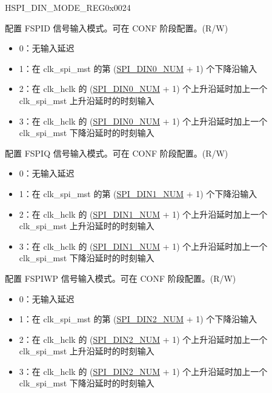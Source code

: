 \begin{register}{H}{SPI\_DIN\_MODE\_REG}{0x0024}\label{regdesc:SPIDINMODEREG}
%
%
%
%
%
%
%
\regnewline%
\begin{regdesc}\begin{reglist}
\label{fielddesc:SPIDIN0MODE}\item [SPI\_DIN0\_MODE] 配置 FSPID 信号输入模式。可在 CONF 阶段配置。(R/W)
\begin{itemize}
    \item 0：无输入延迟
    \item 1：在 clk\_spi\_mst 的第 (\hyperref[fielddesc:SPIDIN0NUM]{SPI\_DIN0\_NUM} + 1) 个下降沿输入
    \item 2：在 clk\_hclk 的 (\hyperref[fielddesc:SPIDIN0NUM]{SPI\_DIN0\_NUM} + 1) 个上升沿延时加上一个 clk\_spi\_mst 上升沿延时的时刻输入
    \item 3：在 clk\_hclk 的 (\hyperref[fielddesc:SPIDIN0NUM]{SPI\_DIN0\_NUM} + 1) 个上升沿延时加上一个 clk\_spi\_mst 下降沿延时的时刻输入
\end{itemize}

\label{fielddesc:SPIDIN1MODE}\item [SPI\_DIN1\_MODE] 配置 FSPIQ 信号输入模式。可在 CONF 阶段配置。(R/W)
\begin{itemize}
    \item 0：无输入延迟
    \item 1：在 clk\_spi\_mst 的第 (\hyperref[fielddesc:SPIDIN1NUM]{SPI\_DIN1\_NUM} + 1) 个下降沿输入
    \item 2：在 clk\_hclk 的 (\hyperref[fielddesc:SPIDIN1NUM]{SPI\_DIN1\_NUM} + 1) 个上升沿延时加上一个 clk\_spi\_mst 上升沿延时的时刻输入
    \item 3：在 clk\_hclk 的 (\hyperref[fielddesc:SPIDIN1NUM]{SPI\_DIN1\_NUM} + 1) 个上升沿延时加上一个 clk\_spi\_mst 下降沿延时的时刻输入
\end{itemize}
\label{fielddesc:SPIDIN2MODE}\item [SPI\_DIN2\_MODE] 配置 FSPIWP 信号输入模式。可在 CONF 阶段配置。(R/W)
\begin{itemize}
    \item 0：无输入延迟
    \item 1：在 clk\_spi\_mst 的第 (\hyperref[fielddesc:SPIDIN2NUM]{SPI\_DIN2\_NUM} + 1) 个下降沿输入
    \item 2：在 clk\_hclk 的 (\hyperref[fielddesc:SPIDIN2NUM]{SPI\_DIN2\_NUM} + 1) 个上升沿延时加上一个 clk\_spi\_mst 上升沿延时的时刻输入
    \item 3：在 clk\_hclk 的 (\hyperref[fielddesc:SPIDIN2NUM]{SPI\_DIN2\_NUM} + 1) 个上升沿延时加上一个 clk\_spi\_mst 下降沿延时的时刻输入
\end{itemize}

\item [见下页]
\end{reglist}\end{regdesc}
\end{register}

